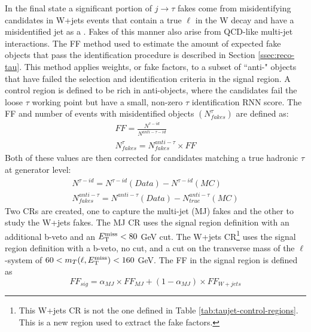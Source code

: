 		In the \taulep final state a significant portion of $j \to \tau$ fakes come from misidentifying \tauhad candidates in W+jets events that contain a true $\ell$ in the W decay and have a misidentified jet as a \tauhad. Fakes of this manner also arise from \acrshort{QCD}-like multi-jet interactions. The \gls{FF} method used to estimate the amount of expected fake \tauhad objects that pass the \tauhad identification procedure is described in Section \ref{ssec:reco-tau}. This method applies weights, or fake factors, to a subset of ``anti-\tauhad" objects that have failed the selection and identification criteria in the signal region. A control region is defined to be rich in anti-\tauhad objects, where the \tauhad candidates fail the loose $\tau$ working point but have a small, non-zero $\tau$ identification \gls{RNN} score. The \gls{FF} and number of events with misidentified \tauhad objects $(N^{\tau}_{fakes})$ are defined as:
		\begin{equation}\label{eqn:ff}\begin{split}
		FF = \frac{ N^{\tau-id} }{N^{anti-\tau-id}} \\
		N_{fakes}^{\tau} = N^{anti-\tau}_{fakes} \times FF
		\end{split}\end{equation}
		Both of these values are then corrected for \tauhad candidates matching a true hadronic $\tau$ at generator level:
		\begin{equation}\label{eqn:ff-corrected}\begin{split}
		N^{\tau-id} = N^{\tau-id}(Data) - N^{\tau-id}(MC) \\
		N^{anti-\tau}_{fakes} = N^{anti-\tau}(Data) - N^{anti-\tau}_{true} (MC)
		\end{split}\end{equation}
		Two \glspl{CR} are created, one to capture the multi-jet (MJ) fakes and the other to study the W+jets fakes. The MJ \gls{CR} uses the \taujets signal region definition with an additional b-veto and an $E_\text{T}^\text{miss} < 80$ GeV cut. The W+jets \gls{CR}\footnote{This W+jets \gls{CR} is not the one defined in Table \ref{tab:taujet-control-regions}. This is a new region used to extract the fake factors.} uses the \taulep signal region definition with a b-veto, no \Etm cut, and a cut on the transverse mass of the $\ell$-\Etm system of $60 < m_{T}(\ell, E_\text{T}^\text{miss})<160$ GeV.
		The \gls{FF} in the signal region is defined as 
		\begin{equation}\label{eqn:ff-sig}
		FF_{sig} = \alpha_{MJ} \times FF_{MJ} + (1 - \alpha_{MJ}) \times FF_{W+jets}
		\end{equation}
